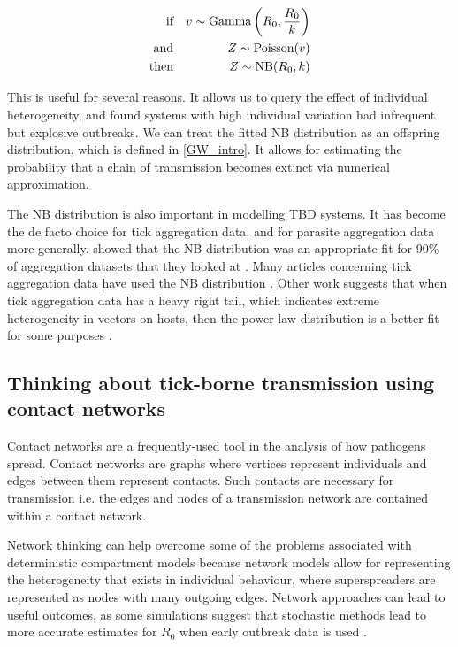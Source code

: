 \documentclass[hidelinks]{article}
\begin{document}
\begin{align}\label{PoissonMixture}
	\text{if} & \space &v \sim \text{Gamma}\left(R_0, \frac{R_0}{k}\right) \nonumber \\
	\text{and} & \space &Z \sim \text{Poisson}(v) \\
	\text{then} & \space &Z \sim \text{NB}(R_0, k) \nonumber
\end{align}

This is useful for several reasons. It allows us to query the effect of individual heterogeneity, and \citet{LloydSmith2005} found systems with high individual variation had infrequent but explosive outbreaks. We can treat the fitted NB distribution as an offspring distribution, which is defined in \ref{GW_intro}. It allows for estimating the probability that a chain of transmission becomes extinct via numerical approximation.

The NB distribution is also important in modelling TBD systems. It has become the de facto choice for tick aggregation data, and for parasite aggregation data more generally. \citet{SHAW1998} showed that the NB distribution was an appropriate fit for 90\% of aggregation datasets that they looked at \citep{SHAW1998}. Many articles concerning tick aggregation data have used the NB distribution \citep{Bown2003, HARRISON2012, Brunner2008}. Other work suggests that when tick aggregation data has a heavy right tail, which indicates extreme heterogeneity in vectors on hosts, then the power law distribution is a better fit for some purposes \citep{Ferreri2014, Bisanzio2010}.

\subsection{Thinking about tick-borne transmission using contact networks}

Contact networks are a frequently-used tool in the analysis of how pathogens spread. Contact networks are graphs where vertices represent individuals and edges between them represent contacts. Such contacts are necessary for transmission i.e. the edges and nodes of a transmission network are contained within a contact network. 

Network thinking can help overcome some of the problems associated with deterministic compartment models because network models allow for representing the heterogeneity that exists in individual behaviour, where superspreaders are represented as nodes with many outgoing edges. Network approaches can lead to useful outcomes, as some simulations suggest that stochastic methods lead to more accurate estimates for $ R_0 $ when early outbreak data is used \citep{Brauer2008b}.
\end{document}
